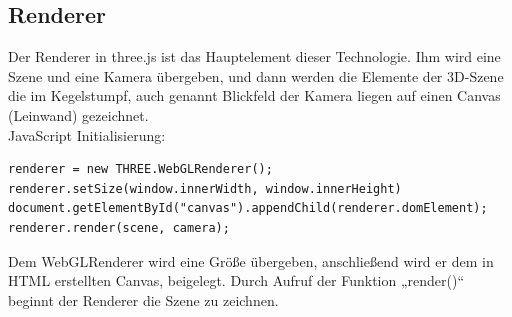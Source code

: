 \subsection{Renderer}
Der Renderer in three.js ist das Hauptelement dieser Technologie. Ihm wird eine Szene und eine Kamera übergeben, und dann werden die Elemente der 3D-Szene die im Kegelstumpf, auch genannt Blickfeld der Kamera liegen auf einen Canvas (Leinwand) gezeichnet.\\
JavaScript Initialisierung:
\begin{lstlisting}
renderer = new THREE.WebGLRenderer();
renderer.setSize(window.innerWidth, window.innerHeight)
document.getElementById("canvas").appendChild(renderer.domElement);
renderer.render(scene, camera);
\end{lstlisting}
Dem WebGLRenderer wird eine Größe übergeben, anschließend wird er dem in HTML erstellten Canvas, beigelegt. Durch Aufruf der Funktion „render()“ beginnt der Renderer die Szene zu zeichnen.
